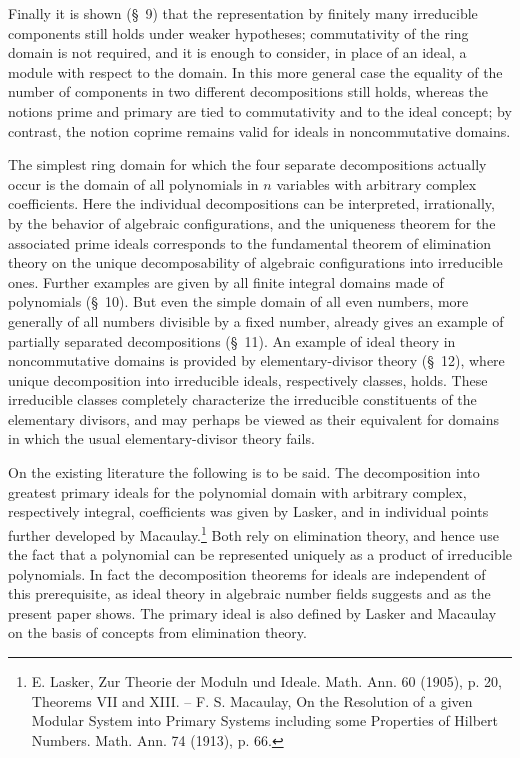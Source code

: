 \documentclass[11pt]{article}
\begin{document}
Finally it is shown (\S~9) that the representation by finitely many irreducible components still holds under weaker hypotheses; commutativity of the ring domain is not required, and it is enough to consider, in place of an ideal, a module with respect to the domain. In this more general case the equality of the number of components in two different decompositions still holds, whereas the notions prime and primary are tied to commutativity and to the ideal concept; by contrast, the notion coprime remains valid for ideals in noncommutative domains.

The simplest ring domain for which the four separate decompositions actually occur is the domain of all polynomials in $n$ variables with arbitrary complex coefficients. Here the individual decompositions can be interpreted, irrationally, by the behavior of algebraic configurations, and the uniqueness theorem for the associated prime ideals corresponds to the fundamental theorem of elimination theory on the unique decomposability of algebraic configurations into irreducible ones. Further examples are given by all finite integral domains made of polynomials (\S~10). But even the simple domain of all even numbers, more generally of all numbers divisible by a fixed number, already gives an example of partially separated decompositions (\S~11). An example of ideal theory in noncommutative domains is provided by elementary-divisor theory (\S~12), where unique decomposition into irreducible ideals, respectively classes, holds. These irreducible classes completely characterize the irreducible constituents of the elementary divisors, and may perhaps be viewed as their equivalent for domains in which the usual elementary-divisor theory fails.

On the existing literature the following is to be said. The decomposition into greatest primary ideals for the polynomial domain with arbitrary complex, respectively integral, coefficients was given by Lasker, and in individual points further developed by Macaulay.\footnote{E. Lasker, Zur Theorie der Moduln und Ideale. Math. Ann. 60 (1905), p. 20, Theorems VII and XIII. -- F. S. Macaulay, On the Resolution of a given Modular System into Primary Systems including some Properties of Hilbert Numbers. Math. Ann. 74 (1913), p. 66.} Both rely on elimination theory, and hence use the fact that a polynomial can be represented uniquely as a product of irreducible polynomials. In fact the decomposition theorems for ideals are independent of this prerequisite, as ideal theory in algebraic number fields suggests and as the present paper shows. The primary ideal is also defined by Lasker and Macaulay on the basis of concepts from elimination theory.
\end{document}
